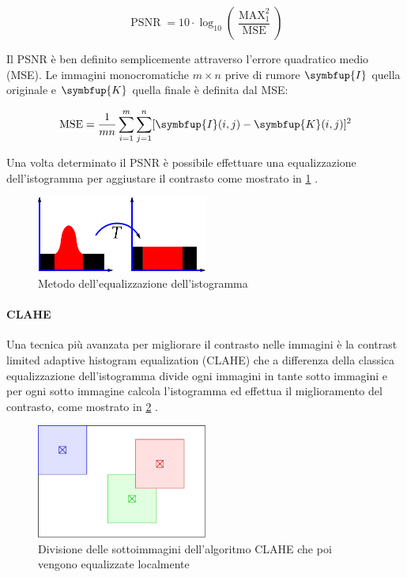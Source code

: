 \[ \operatorname{PSNR}=10 \cdot \log _{10}\left(\frac{\operatorname{MAX}_{1}^{2}}{\operatorname{MSE}}\right) \]

Il PSNR è ben definito semplicemente attraverso l'errore quadratico medio (MSE).
Le immagini monocromatiche \(m\times n\) prive di rumore \(\symbfup{I}\) quella originale e \(\symbfup{K}\) quella finale è definita dal MSE:

\[ \operatorname{MSE}=\frac{1}{m n} \sum_{i=1}^{m} \sum_{j=1}^{n}[\symbfup{I}(i, j)-\symbfup{K}(i, j)]^{2} \]

Una volta determinato il PSNR è possibile effettuare una equalizzazione dell'istogramma per aggiustare il contrasto come mostrato in \cref{fig:histogram} \cite{sunaryo_preprocessing} \cite{pandey_contrast} \cite{hummel_histogram}.


\begin{figure}[ht]
    \centering
    \includegraphics[width=0.5\textwidth]{preprocessing/histogram.png}
    \caption{Metodo dell'equalizzazione dell'istogramma}
    \label{fig:histogram}
\end{figure}



\paragraph{CLAHE}\label{clahe}

Una tecnica più avanzata per migliorare il contrasto nelle immagini è la contrast limited adaptive histogram equalization (CLAHE) che a differenza della classica equalizzazione dell'istogramma divide ogni immagini in tante sotto immagini e per ogni sotto immagine calcola l'istogramma ed effettua il miglioramento del contrasto, come mostrato in \cref{fig:clahe} \cite{hummel_histogram}.


\begin{figure}[ht]
    \centering
    \includegraphics[width=0.5\textwidth]{preprocessing/clahe.pdf}
    \caption{Divisione delle sottoimmagini dell'algoritmo CLAHE che poi vengono equalizzate localmente}
    \label{fig:clahe}
\end{figure}

